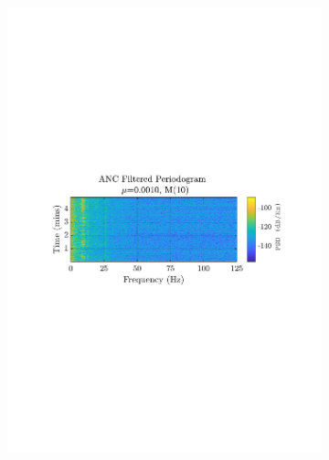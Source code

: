 \documentclass[12pt]{article}
\begin{document}
\begin{figure}[H]
\begin{subfigure}{0.49\textwidth}
					\includegraphics[trim={2.2cm 11.2cm 2.70cm  11.2cm}, clip, width=\textwidth]{../MATLAB/figures/q2_3d_fig03.pdf} 
					\captionsetup{justification=centering}
				\end{subfigure}
				

\end{figure}
\end{document}
